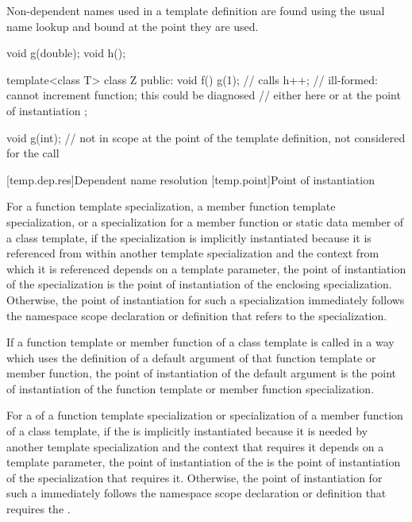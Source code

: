 \pnum
Non-dependent names used in a template definition are found using the
usual name lookup and bound at the point they are used.
\begin{example}

\begin{codeblock}
void g(double);
void h();

template<class T> class Z {
public:
  void f() {
    g(1);           // calls 
    h++;            // ill-formed: cannot increment function; this could be diagnosed
                    // either here or at the point of instantiation
  }
};

void g(int);        // not in scope at the point of the template definition, not considered for the call 
\end{codeblock}
\end{example}

[temp.dep.res]{Dependent name resolution}
[temp.point]{Point of instantiation}

\pnum
{}%
For a function template specialization, a member function template
specialization, or a specialization for a member function or static data member
of a class template,
if the specialization is implicitly instantiated because it is referenced
from within another template specialization and
the context from which it is referenced depends on a template parameter,
the point of instantiation of the specialization is the point of instantiation
of the enclosing specialization.
Otherwise, the point of instantiation for such a specialization immediately
follows the namespace scope declaration
or definition that refers to the specialization.

\pnum
If a function template or member function of a class template is called
in a way which uses the definition of a default argument of that function
template or member function,
the point of instantiation of the default argument is the point of
instantiation of the function template or member function specialization.

\pnum
For a  of a function template
specialization or specialization of a member function of a class template, if
the  is implicitly instantiated because
it is needed by another template specialization and the context that requires
it depends on a template parameter, the point of instantiation of the
 is the point of instantiation of the
specialization that requires it. Otherwise, the point of instantiation for such
a  immediately follows the namespace
scope declaration or definition that requires the
.



